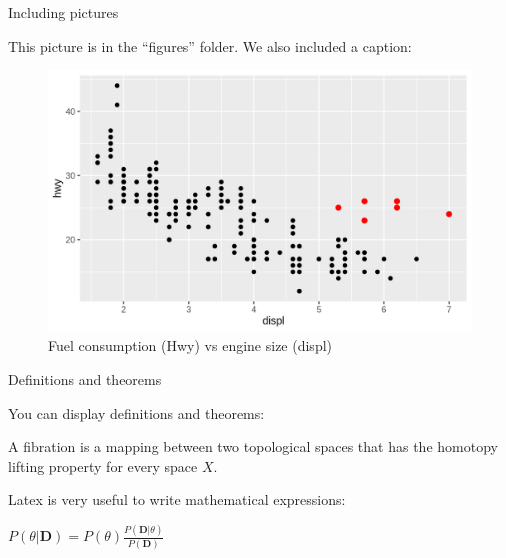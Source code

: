 
\begin{frame}{Including pictures}

This picture is in the ``figures'' folder. We also included a caption:

\begin{figure}
\includegraphics[scale=.5]{figures/graph.png}
\caption{Fuel consumption (Hwy) vs engine size (displ)}
\end{figure}

\end{frame}


\begin{frame}{Definitions and theorems}

You can display definitions and theorems:

\begin{definition}[Fibration]
A fibration is a mapping between two topological spaces that has the homotopy lifting property for every space $X$.
\end{definition}

Latex is very useful to write mathematical expressions:

\begin{theorem}[Bayes]
$P(\theta|\textbf{D}) = P(\theta ) \frac{P(\textbf{D} |\theta)}{P(\textbf{D})}$
\end{theorem}

\end{frame}

